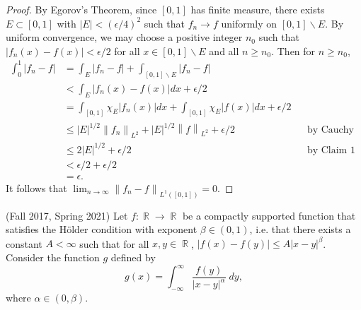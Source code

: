 \documentclass{exam}
\DeclareMathOperator{\RR}{\mathbb{R}}
\theoremstyle{problemstyle}
\newcommand{\norm}[1]{\left\lVert#1\right\rVert} %
\newcommand{\1}[1]{\textbf{1}_{\left[#1\right]}} %
\def\limn{\lim_{n\to\infty}} %
\begin{document}
\begin{questions}
\begin{solution}
\begin{proof}
  By Egorov's Theorem, since $[0,1]$ has finite measure, there exists $E\subset [0,1]$ with $|E|<(\epsilon/4)^{2}$ such that $f_{n}\to f$ uniformly on $[0,1]\backslash E$. By uniform convergence, we may choose a positive integer $n_{0}$ such that $\left| f_{n}(x)-f(x) \right|< \epsilon/2$ for all $x\in [0,1]\backslash E$ and all $n\geq n_{0}$. Then for $n\geq n_{0}$,
  \begin{align*}
    \int_{0}^{1}\left| f_{n}-f \right|
    &= \int_{E} |f_{n}-f| + \int_{[0,1]\backslash E} |f_{n}-f|\\
    &< \int_{E} |f_{n}(x)-f(x)|dx + \epsilon/2\\
    &= \int_{[0,1]} \chi_{E}|f_{n}(x)|dx  + \int_{[0,1]}\chi_{E}|f(x)|dx + \epsilon/2 \\
    &\leq |E|^{1/2}\norm{f_{n}}_{L^{2}}+ |E|^{1/2}\norm{f}_{L^{2}} + \epsilon/2 &&\text{by Cauchy Schwarz}\\
    &\leq 2 |E|^{1/2}+ \epsilon/2 &&\text{by Claim 1}\\
    &< \epsilon/2+\epsilon/2\\
    &=\epsilon.
  \end{align*}
  It follows that $\limn \norm{f_{n}-f}_{L^{1}([0,1])}=0$.
\end{proof}
\end{solution}


\question (Fall 2017, Spring 2021) Let $f: \RR \to \RR$ be a compactly supported function that satisfies the H\"{o}lder condition with exponent $\beta \in (0,1)$, i.e. that there exists a constant $A < \infty$ such that for all $x,y \in \RR$, $|f(x) - f(y)| \leq A|x-y|^\beta$. Consider the function $g$ defined by
%
\[ g(x) = \int_{-\infty}^\infty \frac{f(y)}{|x-y|^\alpha}\; dy, \]
%
where $\alpha \in (0,\beta)$.
%
\begin{parts}

\end{parts}
\end{questions}
\end{document}
